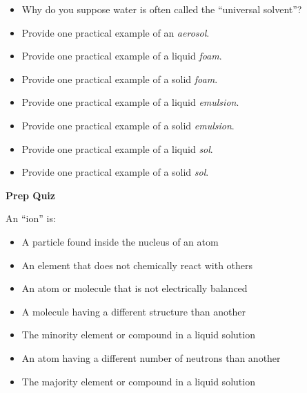 \begin{itemize}
\item{} Why do you suppose water is often called the ``universal solvent''?
\item{} Provide one practical example of an {\it aerosol}.
\item{} Provide one practical example of a liquid {\it foam}.
\item{} Provide one practical example of a solid {\it foam}.
\item{} Provide one practical example of a liquid {\it emulsion}.
\item{} Provide one practical example of a solid {\it emulsion}.
\item{} Provide one practical example of a liquid {\it sol}.
\item{} Provide one practical example of a solid {\it sol}.
\end{itemize}









\vfil \eject

\noindent
{\bf Prep Quiz}

An ``ion'' is:

\begin{itemize}
\item{} A particle found inside the nucleus of an atom
\vskip 5pt
\item{} An element that does not chemically react with others
\vskip 5pt
\item{} An atom or molecule that is not electrically balanced
\vskip 5pt
\item{} A molecule having a different structure than another
\vskip 5pt
\item{} The minority element or compound in a liquid solution
\vskip 5pt
\item{} An atom having a different number of neutrons than another
\vskip 5pt
\item{} The majority element or compound in a liquid solution
\end{itemize}




